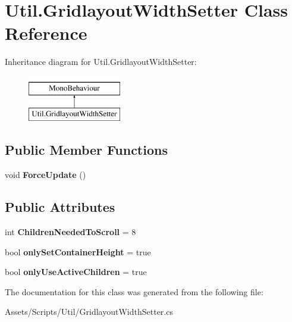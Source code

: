 \hypertarget{class_util_1_1_gridlayout_width_setter}{}\section{Util.\+Gridlayout\+Width\+Setter Class Reference}
\label{class_util_1_1_gridlayout_width_setter}
Inheritance diagram for Util.\+Gridlayout\+Width\+Setter\+:\begin{figure}[H]
\begin{center}
\leavevmode
\includegraphics[height=2.000000cm]{class_util_1_1_gridlayout_width_setter}
\end{center}
\end{figure}
\subsection*{Public Member Functions}
\begin{DoxyCompactItemize}
\item 
void {\bfseries Force\+Update} ()\hypertarget{class_util_1_1_gridlayout_width_setter_ad9ab685b813af9f1bcfbc3fa7b503ab3}{}\label{class_util_1_1_gridlayout_width_setter_ad9ab685b813af9f1bcfbc3fa7b503ab3}

\end{DoxyCompactItemize}
\subsection*{Public Attributes}
\begin{DoxyCompactItemize}
\item 
int {\bfseries Children\+Needed\+To\+Scroll} = 8\hypertarget{class_util_1_1_gridlayout_width_setter_a5c62a3430984c0475f0eaa7f8d674136}{}\label{class_util_1_1_gridlayout_width_setter_a5c62a3430984c0475f0eaa7f8d674136}

\item 
bool {\bfseries only\+Set\+Container\+Height} = true\hypertarget{class_util_1_1_gridlayout_width_setter_ab4051adeb77773dbb4c897d4b1edfb04}{}\label{class_util_1_1_gridlayout_width_setter_ab4051adeb77773dbb4c897d4b1edfb04}

\item 
bool {\bfseries only\+Use\+Active\+Children} = true\hypertarget{class_util_1_1_gridlayout_width_setter_ab0b3f268db6cd516808f306dde347f07}{}\label{class_util_1_1_gridlayout_width_setter_ab0b3f268db6cd516808f306dde347f07}

\end{DoxyCompactItemize}


The documentation for this class was generated from the following file\+:\begin{DoxyCompactItemize}
\item 
Assets/\+Scripts/\+Util/Gridlayout\+Width\+Setter.\+cs\end{DoxyCompactItemize}
